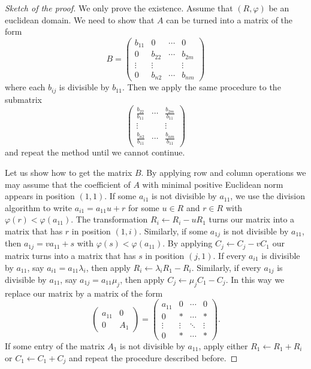 \begin{proof}[Sketch of the proof]
	We only prove the existence. Assume that $(R,\varphi)$ be an euclidean domain.  
	We need to show that $A$ can be turned into a matrix of the form 
\begin{equation*}
B=\begin{pmatrix}
	b_{11} & 0 & \cdots & 0\\
	0 & b_{22} & \cdots & b_{2m}\\
	\vdots & \vdots &&  \vdots\\
	0 & b_{n2} & \cdots & b_{nm}
\end{pmatrix}
\end{equation*}
where each  $b_{ij}$ is divisible by $b_{11}$. Then we apply the same procedure
to the submatrix 
\[
\begin{pmatrix}
	\frac{b_{22}}{b_{11}} & \cdots & \frac{b_{2m}}{b_{11}}\\
	\vdots & &\vdots \\
	\frac{b_{n2}}{b_{11}} & \cdots & \frac{b_{nm}}{b_{11}}
\end{pmatrix}
\]
and repeat the method until we cannot continue. 

Let us show how to get the matrix $B$. 
By applying row and column operations we may assume that the coefficient of $A$ 
with minimal positive Euclidean norm appears in position
$(1,1)$.  
If some $a_{i1}$ is not divisible by $a_{11}$, we use the division algorithm to write   
$a_{i1}=a_{11}u+r$ for some $u\in R$ and $r\in R$ with 
$\varphi(r)<\varphi(a_{11})$. The transformation 
$R_i\leftarrow R_i-uR_1$ turns our matrix into a matrix that 
has $r$ in position $(1,i)$. Similarly, if some $a_{1j}$
is not divisible by $a_{11}$, then $a_{1j}=va_{11}+s$ with $\varphi(s)<\varphi(a_{11})$. 
By applying  
$C_j\leftarrow C_j-vC_1$ our matrix turns into a matrix 
that has $s$ in position 
$(j,1)$.  
If every $a_{i1}$ is divisible by $a_{11}$, say $a_{i1}=a_{11}\lambda_i$, then
apply $R_i\leftarrow \lambda_i R_1-R_i$. Similarly, if 
every $a_{1j}$ is divisible by $a_{11}$, say $a_{1j}=a_{11}\mu_j$, then
apply $C_j\leftarrow \mu_j C_1-C_j$. In this way we replace our matrix by 
a matrix of the form 
\[
\begin{pmatrix}
	a_{11} & 0\\
	0 & A_1
\end{pmatrix}
=\begin{pmatrix}
	a_{11} & 0 & \cdots & 0\\
	0 & * & \cdots & *\\
	\vdots & \vdots & \ddots & \vdots \\
	0 & * & \cdots & *
\end{pmatrix}.
\]
If some entry of the matrix $A_1$ is not divisible by $a_{11}$, apply either 
$R_1\leftarrow R_1+R_i$ or $C_1\leftarrow C_1+C_j$ and repeat 
the procedure described before. 
\end{proof}

